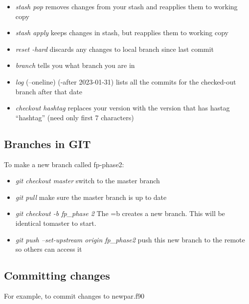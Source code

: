 \begin{itemize}
\item {\it stash pop} removes changes from your stash and reapplies
  them to working copy

\item {\it stash apply} keeps changes in stash, but reapplies them to working copy

\item {\it reset -hard} discards any changes to local branch since last commit

\item {\it branch} tells you what branch you are in

\item {\it log} (--oneline) (-after 2023-01-31) lists all the commits
  for the checked-out branch after that date

\item {\it checkout hashtag} replaces your version with the version
  that has hastag ``hashtag''  (need only first 7 characters)
  
\end{itemize}

\subsection{Branches in GIT}

To make a new branch called fp-phase2:

\begin{itemize}

\item {\it git checkout master} switch to the master branch

\item {\it git pull}  make sure the master branch is up to date


\item {\it git checkout -b fp\_phase 2} The =b creates a new branch.
  This will be identical tomaster to start.

\item {\it git push --set-upstream origin fp\_phase2} push this new branch
to the remote so others can access it 

\end{itemize}


\subsection{Committing changes}

For example, to commit changes to newpar.f90

